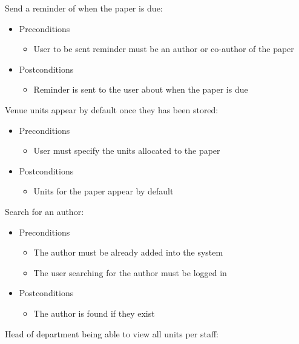 \documentclass[a4paper,12pt]{article}
\begin{document}
Send a reminder of when the paper is due:
\begin{itemize}
    \item Preconditions
    \begin{itemize}
        \item User to be sent reminder must be an author or co-author of the paper
    \end{itemize}
    \item Postconditions
    \begin{itemize}
        \item Reminder is sent to the user about when the paper is due
    \end{itemize}
\end{itemize}
Venue units appear by default once they has been stored:
\begin{itemize}
    \item Preconditions
    \begin{itemize}
        \item User must specify the units allocated to the paper
    \end{itemize}
    \item Postconditions
    \begin{itemize}
        \item Units for the paper appear by default
    \end{itemize}
\end{itemize}
Search for an author:
\begin{itemize}
    \item Preconditions
    \begin{itemize}
        \item The author must be already added into the system
        \item The user searching for the author must be logged in
    \end{itemize}
    \item Postconditions
    \begin{itemize}
        \item The author is found if they exist
    \end{itemize}
\end{itemize}
Head of department being able to view all units per staff:
\end{document}
